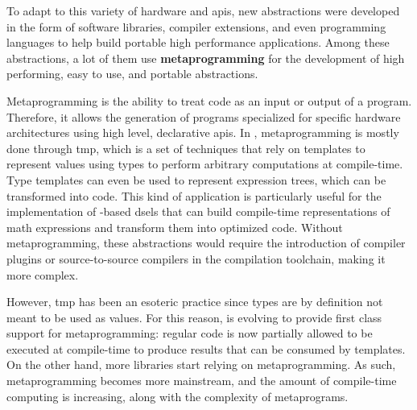 \documentclass[main]{subfiles}
\begin{document}
%
%
%

To adapt to this variety of hardware and \glspl{api}, new abstractions
were developed in the form of software libraries, compiler extensions,
and even programming languages to help build portable high performance
applications.
Among these abstractions, a lot of them use \textbf{metaprogramming} for the
development of high performing, easy to use, and portable abstractions.

Metaprogramming is the ability to treat code as an input or output of a program.
Therefore, it allows the generation of programs specialized for
specific hardware architectures using high level, declarative \glspl{api}.
In \cpp, metaprogramming is mostly done through \gls{tmp}, which is a set of
techniques that rely on \cpp templates to represent values using types to
perform arbitrary computations at compile-time.
Type templates can even be used to represent expression trees,
which can be transformed into code. This kind of application is particularly
useful for the implementation of \cpp-based \glspl{dsel} that can build
compile-time representations of math expressions and transform them into
optimized code. Without metaprogramming, these abstractions would require
the introduction of compiler plugins or source-to-source compilers in the
compilation toolchain, making it more complex.

However, \gls{tmp} has been an esoteric practice since types are by definition
not meant to be used as values. For this reason, \cpp is evolving to provide
first class support for metaprogramming: regular \cpp code is now partially
allowed to be executed at compile-time to produce results that can be consumed
by templates. On the other hand, more \cpp libraries start relying on \cpp
metaprogramming. As such, \cpp metaprogramming becomes more mainstream,
and the amount of compile-time computing is increasing, along with
the complexity of \cpp metaprograms.
\\
\end{document}
